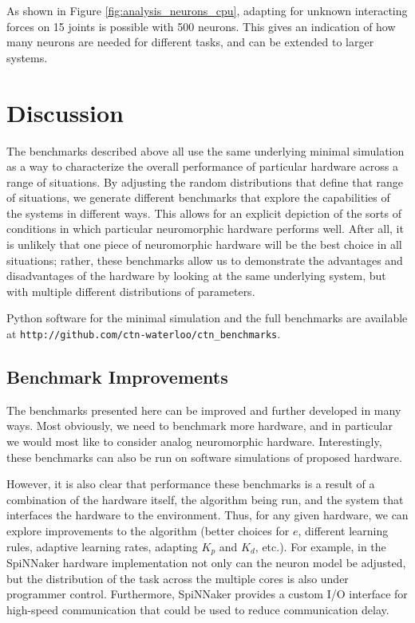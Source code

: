\documentclass{frontiersSCNS} %
\begin{document}
As shown in Figure \ref{fig:analysis_neurons_cpu}, adapting for unknown
interacting forces on 15 joints is possible with 500 neurons.  This gives
an indication of how many neurons are needed for different tasks, and can
be extended to larger systems.

\section{Discussion}

The benchmarks described above all use the same underlying minimal simulation
as a way to characterize the overall performance of particular hardware
across a range of situations.  By adjusting the random distributions that
define that range of situations, we generate different benchmarks that
explore the capabilities of the systems in different ways.  This allows for
an explicit depiction of the sorts of conditions in which particular
neuromorphic hardware performs well.  After all, it is unlikely that one
piece of neuromorphic hardware will be the best choice in all situations;
rather, these benchmarks allow us to demonstrate the advantages and disadvantages
of the hardware by looking at the same underlying system, but with multiple
different distributions of parameters.

Python software for the minimal simulation and the full benchmarks are
available at \texttt{http://github.com/ctn-waterloo/ctn\_benchmarks}.

\subsection{Benchmark Improvements}

The benchmarks presented here can be improved and further developed in many
ways.  Most obviously, we need to benchmark more hardware, and in particular
we would most like to consider analog neuromorphic hardware.  Interestingly, these
benchmarks can also be run on software simulations of proposed hardware.

However, it is also clear that performance these benchmarks is a result of
a combination of the hardware itself, the algorithm being run, and the system that
interfaces the hardware to the environment.  Thus, for any given hardware, 
we can explore improvements to the algorithm (better choices for $e$, 
different learning rules, adaptive learning rates, adapting $K_p$ and $K_d$, etc.).
For example, in the SpiNNaker hardware implementation not only can the neuron model
be adjusted, but the distribution of the task across the multiple cores is also
under programmer control.  Furthermore, SpiNNaker provides a custom I/O interface
for high-speed communication that could be used to reduce communication delay.
\end{document}
